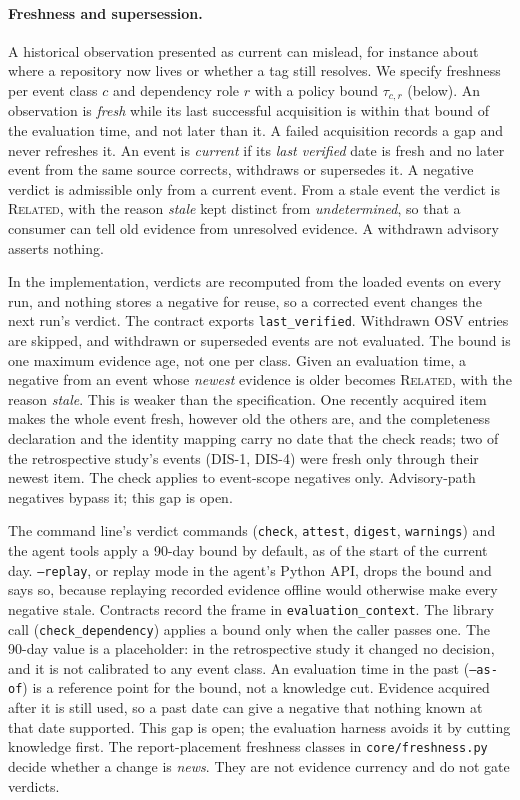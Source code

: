 \documentclass[11pt,a4paper]{article}
\newcommand{\code}[1]{\texttt{#1}}
\begin{document}
\paragraph{Freshness and supersession.} A historical observation
presented as current can mislead, for instance about where a
repository now lives or whether a tag still resolves. We specify
freshness per event class $c$ and dependency role $r$ with a policy
bound $\tau_{c,r}$ (below). An observation is \emph{fresh} while its
last successful acquisition is within that bound of the evaluation
time, and not later than it. A failed acquisition records a
gap and never refreshes it. An event is \emph{current} if its
\emph{last verified} date is fresh and no later event from the same
source corrects, withdraws or supersedes it. A negative verdict is
admissible only from a current event. From a stale event the verdict
is \textsc{Related}, with the reason \emph{stale} kept distinct from
\emph{undetermined}, so that a consumer can tell old evidence from
unresolved evidence. A withdrawn advisory asserts nothing.

In the implementation, verdicts are recomputed from the loaded events
on every run, and nothing stores a negative for reuse, so a corrected
event changes the next run's verdict. The contract exports
\code{last\_verified}. Withdrawn OSV entries are skipped, and withdrawn
or superseded events are not evaluated. The bound is one maximum
evidence age, not one per class. Given an evaluation time, a negative
from an event whose \emph{newest} evidence is older becomes
\textsc{Related}, with the reason \emph{stale}. This is weaker than the
specification. One recently acquired item makes the whole event fresh,
however old the others are, and the completeness declaration and the
identity mapping carry no date that the check reads; two of the
retrospective study's events (DIS-1, DIS-4) were fresh only through
their newest item. The check applies to event-scope negatives only. Advisory-path
negatives bypass it; this gap is open.

The command line's verdict commands (\code{check}, \code{attest},
\code{digest}, \code{warnings}) and the agent tools apply a 90-day
bound by default, as of the start of the current day. \code{--replay},
or replay mode in the agent's Python API, drops the bound and says so,
because replaying recorded evidence offline would otherwise make every
negative stale. Contracts record the frame in
\code{evaluation\_context}. The library call (\code{check\_dependency})
applies a bound only when the caller passes one. The 90-day value is a
placeholder: in the retrospective study it changed no decision, and it
is not calibrated to any event class. An evaluation time in the past
(\code{--as-of}) is a reference point for the bound, not a knowledge
cut. Evidence acquired after it is still used, so a past date can give
a negative that nothing known at that date supported. This gap is open;
the evaluation harness avoids it by cutting knowledge first. The
report-placement
freshness classes in \code{core/freshness.py} decide whether a change
is \emph{news}. They are not evidence currency and do not gate
verdicts.
\end{document}
